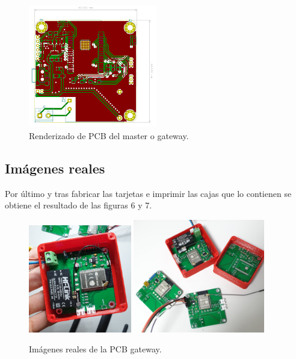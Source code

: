\documentclass[paper=a4, fontsize=11pt,twoside]{scrartcl}	%
\begin{document}
        \begin{center}
            \begin{figure}[ht]
                \centering
                \includegraphics[width=0.5\textwidth]{../receiver_PCB.PNG}
                \caption{Renderizado de PCB del master o gateway.}
                \label{fig:mesh6}
            \end{figure}    
        \end{center}
    \subsection{Imágenes reales}
        Por último y tras fabricar las tarjetas e imprimir las cajas que lo contienen se obtiene el resultado de las figuras 6 y 7.
        \begin{center}
            \begin{figure}[ht]
                \centering
                \includegraphics[width=0.4\textwidth]{../3d_antenna.jpeg}
                \includegraphics[width=0.51\textwidth]{../real_master_pcb.jpeg}
                \caption{Imágenes reales de la PCB gateway.}
                \label{fig:mesh7}
            \end{figure}    
        \end{center}
\end{document}
